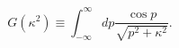 \begin{equation}
G(\kappa^2) \equiv \int_{-\infty} ^\infty dp
\frac{\cos p}{\sqrt{p^2+\kappa^2}}.
\label{G}
\end{equation} 
